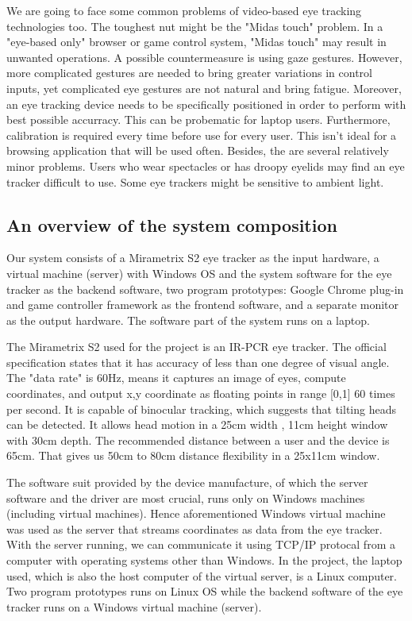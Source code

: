 \documentclass[english]{tktltiki}
\begin{document}
We are going to face some common problems of video-based eye tracking technologies too. The toughest nut might be the "Midas touch" problem.\cite{Velichkovsky97} In a "eye-based only" browser or game control system, "Midas touch" may result in unwanted operations. A possible countermeasure is using gaze gestures. \cite{Ohno:1998:FEG:786112.786297} However, more complicated gestures are needed to bring greater variations in control inputs, yet complicated eye gestures are not natural and bring fatigue. Moreover, an eye tracking device needs to be specifically positioned in order to perform with best possible accurracy. This can be probematic for laptop users.  Furthermore, calibration is required every time before use for every user. This isn't ideal for a browsing application that will be used often. Besides, the are several relatively minor problems. Users who wear spectacles or has droopy eyelids may find an eye tracker difficult to use. Some eye trackers might be sensitive to ambient light. 

\subsection{An overview of the system composition}

Our system consists of a Mirametrix S2 eye tracker as the input hardware, a virtual machine (server) with Windows OS and the system software for the eye tracker as the backend software, two program prototypes: Google Chrome plug-in and game controller framework as the frontend software, and a separate monitor as the output hardware. The software part of the system runs on a laptop.

The Mirametrix S2 used for the project is an IR-PCR eye tracker. The official specification states that it has accuracy of less than one degree of visual angle. The "data rate" is 60Hz, means it captures an image of eyes, compute coordinates, and output x,y coordinate as floating points in range [0,1] 60 times per second. It is capable of binocular tracking, which suggests that tilting heads can be detected. It allows head motion in a 25cm width , 11cm height window with 30cm depth. The recommended distance between a user and the device is 65cm. That gives us 50cm to 80cm distance flexibility in a 25x11cm window. 

The software suit provided by the device manufacture, of which the server software and the driver are most crucial, runs only on Windows machines (including virtual machines). Hence aforementioned Windows virtual machine was used as the server that streams coordinates as data from the eye tracker. With the server running, we can communicate it using TCP/IP protocal from a computer with operating systems other than Windows. In the project, the laptop used, which is also the host computer of the virtual server, is a Linux computer. Two program prototypes runs on Linux OS while the backend software of the eye tracker runs on a Windows virtual machine (server).
\end{document}
